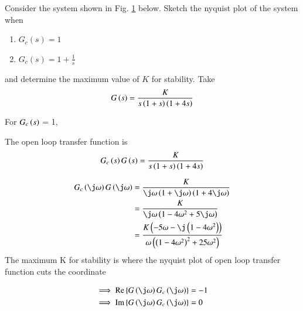 
% 
Consider the system shown in Fig. \ref{fig:ee18btech11034}
below. Sketch the nyquist plot of the system when
\begin{enumerate}
\item $G_c(s) = 1$
\item $G_c(s) = 1+\frac{1}{s}$
\end{enumerate} 

and determine the maximum value of $K$ for stability.
Take  
\begin{align}
G\left(s\right) = \frac{K}{s\left(1+s\right)\left(1+4s\right)}
\label{eq:ee18btech11034_Gs}
\end{align}

\begin{figure}[!ht]
	\begin{center}
		
		\resizebox{\columnwidth}{!}{}
	\end{center}
\caption{}
\label{fig:ee18btech11034}
\end{figure}

\solution
 For $G_{c}\left(s\right)$ = 1,

The open loop transfer function is 
\begin{align}
    G_{c}\left(s\right)G\left(s\right) = \frac{K}{s\left(1+s\right)\left(1+4s\right)}
\end{align}

\begin{align}
    G_{c}\brak{\j\omega}G\brak{\j\omega} &= \frac{K}{{\j\omega}\brak{1+\j\omega}\brak{1+4\j\omega}}
    \\
    &= \frac{K}{{\j\omega}\brak{1-4\omega^2+5\j\omega}}
    \\
    &= \frac{K\brak{-5\omega-\j\brak{1-4\omega^2}}}{{\omega}\brak{\brak{1-4\omega^2}^2+25\omega^2}}
    \end{align}
The maximum K for stability is where the nyquist plot of open loop transfer function cuts the coordinate 


\begin{align}
 \implies    \text{Re} \cbrak{G\brak{\j \omega}G_{c}\brak{\j\omega}} &= -1
 \label{eq:ee18btech11034_eq_Re}
 \\
 \implies \text{Im} \cbrak{G\brak{\j \omega}G_{c}\brak{\j\omega}} &= 0
 \label{eq:ee18btech11034_eq_Im}
\end{align}

